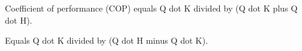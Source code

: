 Coefficient of performance (COP) equals Q dot K divided by (Q dot K plus Q dot H).  

Equals Q dot K divided by (Q dot H minus Q dot K).